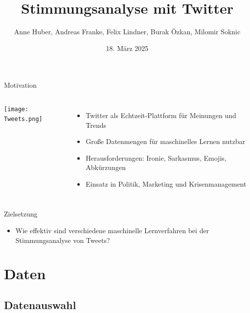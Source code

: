 \documentclass[aspectratio=169]{beamer}
\title{Stimmungsanalyse mit Twitter}
\author[Team Twitter Sentiment]{Anne Huber, Andreas Franke, Felix Lindner, Burak Özkan, Milomir Soknic}
\institute{Projektpraktikum Web Science,\\Artificial Intelligence Group,\\Universität Hagen, Deutschland}
\date{18. März 2025}
\begin{document}
\begin{frame}
	\titlepage
\end{frame}

\begin{frame}{Motivation}
	\begin{columns}
		\centering
		\texttt{[image: Tweets.png]}

		\begin{itemize}
			\item Twitter als Echtzeit-Plattform für Meinungen und Trends
			\item Große Datenmengen für maschinelles Lernen nutzbar
			\item Herausforderungen: Ironie, Sarkasmus, Emojis, Abkürzungen
			\item Einsatz in Politik, Marketing und Krisenmanagement
		\end{itemize}
	\end{columns}
\end{frame}

\begin{frame}{Zielsetzung}
	\Large
	\begin{itemize}
		\item Wie effektiv sind verschiedene maschinelle Lernverfahren bei der Stimmungsanalyse von Tweets?
	\end{itemize}
\end{frame}


\section{Daten}


\subsection{Datenauswahl}
\end{document}

